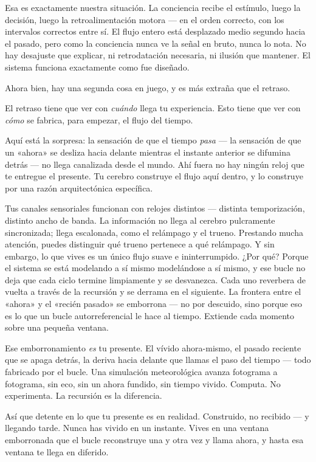 \documentclass[11pt, twoside, openright]{book}
\begin{document}
Esa es exactamente nuestra situación. La conciencia recibe el estímulo, luego la decisión, luego la retroalimentación motora --- en el orden correcto, con los intervalos correctos entre sí. El flujo entero está desplazado medio segundo hacia el pasado, pero como la conciencia nunca ve la señal en bruto, nunca lo nota. No hay desajuste que explicar, ni retrodatación necesaria, ni ilusión que mantener. El sistema funciona exactamente como fue diseñado.

Ahora bien, hay una segunda cosa en juego, y es más extraña que el retraso.

El retraso tiene que ver con \textit{cuándo} llega tu experiencia. Esto tiene que ver con \textit{cómo} se fabrica, para empezar, el flujo del tiempo.

Aquí está la sorpresa: la sensación de que el tiempo \textit{pasa} --- la sensación de que un «ahora» se desliza hacia delante mientras el instante anterior se difumina detrás --- no llega canalizada desde el mundo. Ahí fuera no hay ningún reloj que te entregue el presente. Tu cerebro construye el flujo aquí dentro, y lo construye por una razón arquitectónica específica.

Tus canales sensoriales funcionan con relojes distintos --- distinta temporización, distinto ancho de banda. La información no llega al cerebro pulcramente sincronizada; llega escalonada, como el relámpago y el trueno. Prestando mucha atención, puedes distinguir qué trueno pertenece a qué relámpago. Y sin embargo, lo que vives es un único flujo suave e ininterrumpido. ¿Por qué? Porque el sistema se está modelando a sí mismo modelándose a sí mismo, y ese bucle no deja que cada ciclo termine limpiamente y se desvanezca. Cada uno reverbera de vuelta a través de la recursión y se derrama en el siguiente. La frontera entre el «ahora» y el «recién pasado» se emborrona --- no por descuido, sino porque eso es lo que un bucle autorreferencial le hace al tiempo. Extiende cada momento sobre una pequeña ventana.

Ese emborronamiento \textit{es} tu presente. El vívido ahora-mismo, el pasado reciente que se apaga detrás, la deriva hacia delante que llamas el paso del tiempo --- todo fabricado por el bucle. Una simulación meteorológica avanza fotograma a fotograma, sin eco, sin un ahora fundido, sin tiempo vivido. Computa. No experimenta. La recursión es la diferencia.

Así que detente en lo que tu presente es en realidad. Construido, no recibido --- y llegando tarde. Nunca has vivido en un instante. Vives en una ventana emborronada que el bucle reconstruye una y otra vez y llama ahora, y hasta esa ventana te llega en diferido.
\end{document}
